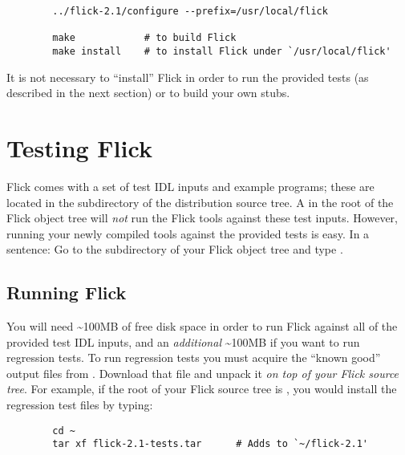 \begin{verbatim}
        ../flick-2.1/configure --prefix=/usr/local/flick

        make            # to build Flick
        make install    # to install Flick under `/usr/local/flick'
\end{verbatim}

It is not necessary to ``install'' Flick in order to run the provided tests (as
described in the next section) or to build your own stubs.



\section{Testing Flick}
\label{sec:Testing Flick}

Flick comes with a set of test IDL inputs and example programs; these are
located in the  subdirectory of the distribution source tree.  A
 in the root of the Flick object tree will \emph{not} run the
Flick tools against these test inputs.  However, running your newly compiled
tools against the provided tests is easy.  In a sentence: Go to the
 subdirectory of your Flick object tree and type .



\subsection{Running Flick}
\label{subsec:Running Flick}

You will need \~{}100MB of free disk space in order to run Flick against all of
the provided test IDL inputs, and an \emph{additional} \~{}100MB if you want to
run regression tests.  To run regression tests you must acquire the ``known
good'' output files from
.
Download that file and unpack it \emph{on top of your Flick source tree}.  For
example, if the root of your Flick source tree is , you
would install the regression test files by typing:

\begin{verbatim}
        cd ~
        tar xf flick-2.1-tests.tar      # Adds to `~/flick-2.1'
\end{verbatim}

